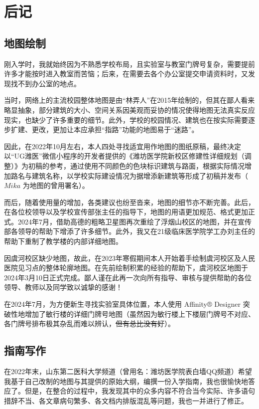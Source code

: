 \chapter[后记]{后记}
\section[地图绘制]{地图绘制}
刚入学时，我就始终因为不熟悉学校布局，且实验室与教室门牌号复杂，需要提前许多才能按时进入教室而苦恼；后来，在需要去各个办公室提交申请资料时，又发现找不到办公室的地点。

当时，网络上的主流校园整体地图是由“林弄人”在2015年绘制的，但其在鄙人看来略显抽象，部分建筑的大小、空间关系因美观而妥协的情况使得地图无法真实反应现实，也缺少了许多重要的细节。此外，学校的校园情况、建筑也在按实际需要逐步扩建、更改，更加让本应承担“指路”功能的地图易于“迷路”。

因此，在2022年10月左右，本人四处寻找适宜用作地图的图纸原稿，最终决定以“UG潍医”微信小程序的开发者提供的《潍坊医学院新校区修建性详细规划（调整）》为初稿的参考，通过使用不同颜色的色块标识建筑与路面，根据实际情况增加路名与建筑名称，以学校实际建设情况为据增添新建筑等形成了初稿并发布（$Mika$ 为地图的曾用署名）。

而后，随着使用量的增加，各类建议也纷至沓来，地图的细节亦不断完善。此后，在各位校领导以及学校宣传部张主任的指导下，地图的用语更加规范、格式更加正式。2024年7月，借助高德的粗略卫星图再次重绘了浮烟山校区的地图，并在宣传部各领导的帮助下增添了许多细节。此外，我又在21级临床医学院学工办刘主任的帮助下重制了教学楼的内部详细地图。

因虞河校区缺少地图，故此，在2023年寒假期间本人开始着手绘制虞河校区及人民医院见习点的整体轮廓地图。在先前绘制积累的经验的帮助下，虞河校区地图于2024年3月10日正式完成。鄙人谨在此再一次向所有指导、审核与提供帮助的各位领导、教师以及同学致以诚挚的感谢！

在2024年7月，为方便新生寻找实验室具体位置，本人使用 Affinity® Designer 突破性地增加了敏行楼的详细门牌号地图（虽然因为敏行楼上下楼层门牌号不对应、各门牌号排布极其杂乱而难以辨认，\sout{但有总比没有好}）。

\section[指南写作]{指南写作}

在2022年末，山东第二医科大学频道（曾用名：潍坊医学院表白墙QQ频道）希望我基于自己改制的地图与其提供的原始大纲，编撰一份入学指南，我也很愉快地答应了。但是，在整合的过程中，我发现其中的众多内容不符合当今实际、许多语句措辞不当、各文章病句繁多、各文档内排版混乱等问题，我也一并进行了修正。

